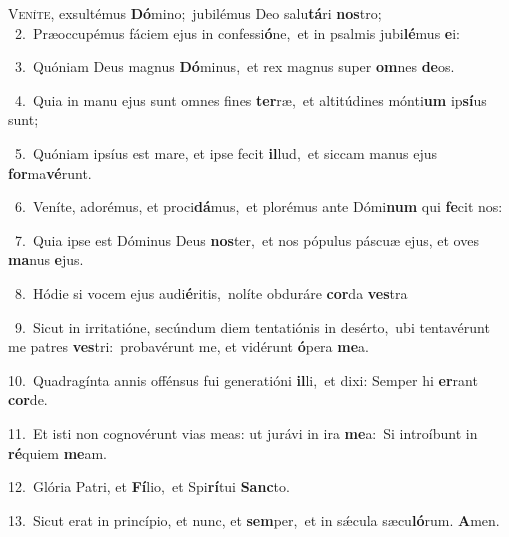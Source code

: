 \lettrine{\initial\textcolor{\initialcolor}{V}}{eníte,} exsultémus \textbf{Dó}\-mino;~\star jubilémus Deo salu\-\textbf{tá}\-ri \textbf{nos}\-tro;\\
{\numbfont\textcolor{\numbcolor}{~2.}}~Præoccupémus fáciem ejus in confessi\-\textbf{ó}\-ne,~\star et in psalmis jubi\-\textbf{lé}\-mus \textbf{e}\-i:\par
{\numbfont\textcolor{\numbcolor}{~3.}}~Quóniam Deus magnus \textbf{Dó}\-minus,~\star et rex magnus super \textbf{om}\-nes \textbf{de}\-os.\par
{\numbfont\textcolor{\numbcolor}{~4.}}~Quia in manu ejus sunt omnes fines \textbf{ter}\-ræ,~\star et altitúdines mónti\textbf{um} ip\-\textbf{sí}\-us sunt;\par
{\numbfont\textcolor{\numbcolor}{~5.}}~Quóniam ipsíus est mare, et ipse fecit \textbf{il}\-lud,~\star et siccam manus ejus \textbf{for}\-ma\-\textbf{vé}\-runt.\par
{\numbfont\textcolor{\numbcolor}{~6.}}~Veníte, adorémus, et proci\-\textbf{dá}\-mus,~\star et plorémus ante Dómi\textbf{num} qui \textbf{fe}\-cit nos:\par
{\numbfont\textcolor{\numbcolor}{~7.}}~Quia ipse est Dóminus Deus \textbf{nos}\-ter,~\star et nos pópulus páscuæ ejus, et oves \textbf{ma}\-nus \textbf{e}\-jus.\par
{\numbfont\textcolor{\numbcolor}{~8.}}~Hódie si vocem ejus audi\-\textbf{é}\-ritis,~\star nolíte obduráre \textbf{cor}\-da \textbf{ves}\-tra\par
{\numbfont\textcolor{\numbcolor}{~9.}}~Sicut in irritatióne, secúndum diem tentatiónis in desérto,~\dagger ubi tentavérunt me patres \textbf{ves}\-tri:~\star probavérunt me, et vidérunt \textbf{ó}\-pera \textbf{me}\-a.\par
{\numbfont\textcolor{\numbcolor}{10.}}~Quadragínta annis offénsus fui generatióni \textbf{il}\-li,~\star et dixi: Semper hi \textbf{er}\-rant \textbf{cor}\-de.\par
{\numbfont\textcolor{\numbcolor}{11.}}~Et isti non cognovérunt vias meas: ut jurávi in ira \textbf{me}\-a:~\star Si introíbunt in \textbf{ré}\-quiem \textbf{me}\-am.\par
{\numbfont\textcolor{\numbcolor}{12.}}~Glória Patri, et \textbf{Fí}\-lio,~\star et Spi\-\textbf{rí}\-tui \textbf{Sanc}\-to.\par
{\numbfont\textcolor{\numbcolor}{13.}}~Sicut erat in princípio, et nunc, et \textbf{sem}\-per,~\star et in sǽcula sæcu\-\textbf{ló}\-rum. \textbf{A}\-men.\par
